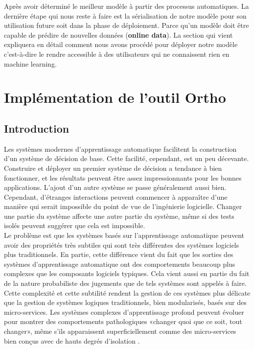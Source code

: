 \documentclass[12pt, french]{report}
\begin{document}
Après avoir déterminé le meilleur modèle à partir des processus automatiques. La dernière étape qui nous reste à faire est la sérialisation de notre modèle pour son utilisation future soit dans la phase de déploiement. Parce qu'un modèle doit être capable de prédire de nouvelles données (\textbf{online data}). La section qui vient expliquera en détail comment nous avons procédé pour déployer notre modèle c'est-à-dire le rendre accessible à des utilisateurs qui ne connaissent rien en machine learning.  \\ 



 

\chapter{Implémentation de l'outil Ortho}
\section{Introduction}

Les systèmes modernes d'apprentissage automatique facilitent la construction d'un système de décision de base. Cette facilité, cependant, est un peu décevante. Construire et déployer un premier système de décision a tendance à bien fonctionner, et les résultats peuvent être assez impressionnants pour les bonnes applications. L'ajout d'un autre système se passe généralement aussi bien. Cependant, d'étranges interactions peuvent commencer à apparaître d'une manière qui serait impossible du point de vue de l'ingénierie logicielle. Changer une partie du système affecte une autre partie du système, même si des tests isolés peuvent suggérer que cela est impossible. \\

Le problème est que les systèmes basés sur l'apprentissage automatique peuvent avoir des propriétés très subtiles qui sont très différentes des systèmes logiciels plus traditionnels. En partie, cette différence vient du fait que les sorties des systèmes d'apprentissage automatique ont des comportements beaucoup plus complexes que les composants logiciels typiques. Cela vient aussi en partie du fait de la nature probabiliste des jugements que de tels systèmes sont appelés à faire. \\

Cette complexité et cette subtilité rendent la gestion de ces systèmes plus délicate que la gestion de systèmes logiques traditionnels, bien modularisés, basés sur des micro-services. Les systèmes complexes d'apprentissage profond peuvent évoluer pour montrer des comportements pathologiques «changer quoi que ce soit, tout changer», même s'ils apparaissent superficiellement comme des micro-services bien conçus avec de hauts degrés d'isolation \cite{key7}.\\
\end{document}
